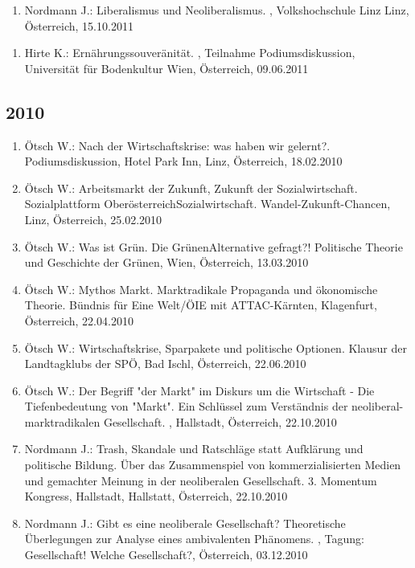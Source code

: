 \begin{enumerate}
	\item Nordmann J.: Liberalismus und Neoliberalismus. , Volkshochschule Linz Linz, Österreich, 15.10.2011
\end{enumerate}

\begin{enumerate}
	\item Hirte K.: Ernährungssouveränität. , Teilnahme Podiumsdiskussion, Universität für Bodenkultur Wien, Österreich, 09.06.2011
\end{enumerate}
\subsection*{2010}

\begin{enumerate}
	\item Ötsch W.: Nach der Wirtschaftskrise: was haben wir gelernt?. Podiumsdiskussion, Hotel Park Inn, Linz, Österreich, 18.02.2010
	\item Ötsch W.: Arbeitsmarkt der Zukunft, Zukunft der Sozialwirtschaft. Sozialplattform OberösterreichSozialwirtschaft. Wandel-Zukunft-Chancen, Linz, Österreich, 25.02.2010
	\item Ötsch W.: Was ist Grün. Die GrünenAlternative gefragt?! Politische Theorie und Geschichte der Grünen, Wien, Österreich, 13.03.2010
	\item Ötsch W.: Mythos Markt. Marktradikale Propaganda und ökonomische Theorie. Bündnis für Eine Welt/ÖIE mit ATTAC-Kärnten, Klagenfurt, Österreich, 22.04.2010
	\item Ötsch W.: Wirtschaftskrise, Sparpakete und politische Optionen. Klausur der Landtagklubs der SPÖ, Bad Ischl, Österreich, 22.06.2010
	\item Ötsch W.: Der Begriff "der Markt" im Diskurs um die Wirtschaft - Die Tiefenbedeutung von "Markt". Ein Schlüssel zum Verständnis der neoliberal-marktradikalen Gesellschaft. , Hallstadt, Österreich, 22.10.2010
	\item Nordmann J.: Trash, Skandale und Ratschläge statt Aufklärung und politische Bildung. Über das Zusammenspiel von kommerzialisierten Medien und gemachter Meinung in der neoliberalen Gesellschaft. 3. Momentum Kongress, Hallstadt, Hallstatt, Österreich, 22.10.2010
	\item Nordmann J.: Gibt es eine neoliberale Gesellschaft? Theoretische Überlegungen zur Analyse eines ambivalenten Phänomens. , Tagung: Gesellschaft! Welche Gesellschaft?, Österreich, 03.12.2010
\end{enumerate}

